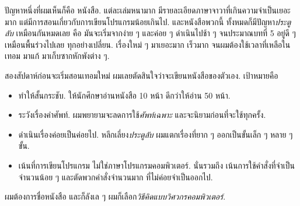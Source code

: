 ปัญหาหนึ่งที่ผมเห็นก็คือ หนังสือ.
แต่ละเล่มหนามาก
มีรายละเอียดภาษาจาวาที่เกินความจำเป็นเยอะมาก
แต่มีการสอนเกี่ยวกับการเขียนโปรแกรมน้อยเกินไป.
และหนังสือพวกนี้ ทั้งหมดก็มีปัญหา\textit{ประตูลับ} เหมือนกันหมดเลย
คือ มันจะเริ่มจากง่าย ๆ และค่อย ๆ ดำเนินไปช้า ๆ 
จนประมาณบทที่ 5 อยู่ดี ๆ เหมือนพื้นร่วงไปเลย ทุกอย่างเปลี่ยน.
เรื่องใหม่ ๆ มาเยอะมาก เร็วมาก
จนผมต้องใช้เวลาที่เหลือในเทอม มาแก้ มาเก็บซากหักพังต่าง ๆ.


สองสัปดาห์ก่อนจะเริ่มสอนเทอมใหม่
ผมเลยตัดสินใจว่าจะเขียนหนังสือของตัวเอง.
เป้าหมายคือ

\begin{itemize}


\item ทำให้สั้นกระชับ.
ให้นักศึกษาอ่านหนังสือ 10 หน้า ดีกว่าให้อ่าน 50 หน้า.


\item ระวังเรื่องคำศัพท์.
ผมพยายามจะลดการใช้\textit{ศัพท์เฉพาะ}
และจะนิยามก่อนที่จะใช้ทุกครั้ง.


\item ดำเนินเรื่องค่อยเป็นค่อยไป.
หลีกเลี่ยง\textit{ประตูลับ}
ผมแตกเรื่องที่ยาก ๆ ออกเป็นขั้นเล็ก ๆ หลาย ๆ ขั้น.


\item เน้นที่การเขียนโปรแกรม ไม่ใช่ภาษาโปรแกรมคอมพิวเตอร์.
นั่นรวมถึง เน้นการใช้คำสั่งที่จำเป็นจำนวนน้อย ๆ และตัดพวกคำสั่งจำนวนมาก ที่ไม่ค่อยจำเป็นออกไป.

\end{itemize}


ผมต้องการชื่อหนังสือ และก็ลังเล ๆ ผมก็เลือก\textit{วิธีคิดแบบวิศวกรคอมพิวเตอร์}.

